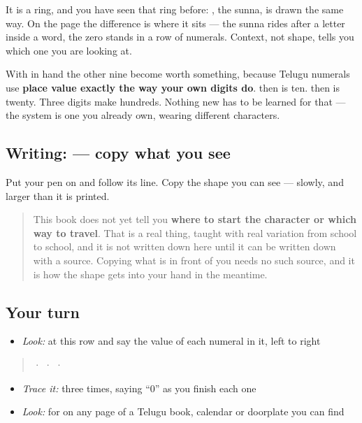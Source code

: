 It is a ring, and you have seen that ring before: \textbf{}, the sunna, is drawn the same way. On the page the difference is where it sits — the sunna rides after a letter inside a word, the zero stands in a row of numerals. Context, not shape, tells you which one you are looking at.

With  in hand the other nine become worth something, because Telugu numerals use \textbf{place value exactly the way your own digits do}.  then  is ten.  then  is twenty. Three digits make hundreds. Nothing new has to be learned for that — the system is one you already own, wearing different characters.

\subsection*{Writing:  — copy what you see}
Put your pen on  and follow its line. Copy the shape you can see — slowly, and larger than it is printed.

\begin{quote}
This book does not yet tell you \textbf{where to start the character or which way to travel}. That is a real thing, taught with real variation from school to school, and it is not written down here until it can be written down with a source. Copying what is in front of you needs no such source, and it is how the shape gets into your hand in the meantime.
\end{quote}

\subsection*{Your turn}
\begin{itemize}
\raggedright
  \item \emph{Look:} at this row and say the value of each numeral in it, left to right
\end{itemize}

\begin{quote}
  ·    ·    ·  
\end{quote}

\begin{itemize}
\raggedright
  \item \emph{Trace it:}  three times, saying \textquotedblleft{}0\textquotedblright{} as you finish each one
  \item \emph{Look:} for  on any page of a Telugu book, calendar or doorplate you can find
\end{itemize}

